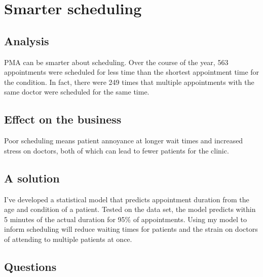 \section{Smarter scheduling}
\subsection{Analysis}
PMA can be smarter about scheduling. Over the course of the year, 563 appointments were scheduled for less time than the shortest appointment time for the condition. In fact, there were 249 times that multiple appointments with the same doctor were scheduled for the same time.

\subsection{Effect on the business} Poor scheduling means patient annoyance at longer wait times and increased stress on doctors, both of which can lead to fewer patients for the clinic.

\begin{comment}
{\tiny
\begin{tabular}{lll}
\toprule
condition & min appointment time & \# appointments scheduled for less time than the minimum\\
\midrule
1 & 1 & 1 \\
\bottomrule
\end{tabular}
}
\end{comment}

\subsection{A solution} I've developed a statistical model that predicts appointment duration from the age and condition of a patient. Tested on the data set, the model predicts within 5 minutes of the actual duration for 95\% of appointments. Using my model to inform scheduling will reduce waiting times for patients and the strain on doctors of attending to multiple patients at once.

\begin{figure}[h]
\centering
{}
\label{aac}
\end{figure}

\subsection{Questions}
